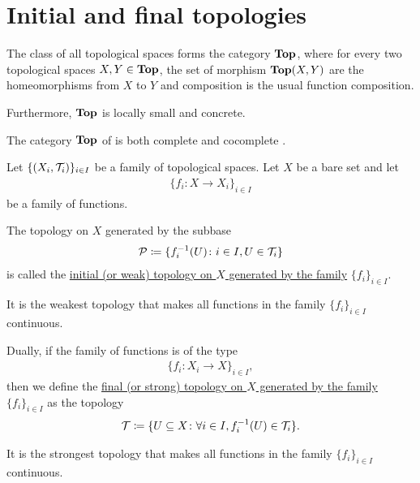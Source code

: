 \section{Initial and final topologies}\label{sec:initial_final_topologies}

\begin{definition}\label{def:category_of_topological_spaces}
  The class of all topological spaces forms the category $\operatorname{\mathbf{Top}}$, where for every two topological spaces $X, Y \in \operatorname{\mathbf{Top}}$, the set of morphism $\operatorname{\mathbf{Top}}(X, Y)$ are the homeomorphisms from $X$ to $Y$ and composition is the usual function composition.

  Furthermore, $\operatorname{\mathbf{Top}}$ is locally small and concrete.
\end{definition}

\begin{theorem}
  The category $\operatorname{\mathbf{Top}}$ of is both complete  and cocomplete .
\end{theorem}

\begin{definition}\label{def:initial_topology}\cite{nLab:top}
  Let $\{ (X_i, \mathcal T_i) \}_{i \in I}$ be a family of topological spaces. Let $X$ be a bare set and let
  \begin{align*}
    \{ f_i: X \to X_i \}_{i \in I}
  \end{align*}
  be a family of functions.

  The topology on $X$ generated by the subbase
  \begin{align*}
    \mathcal P \coloneqq \{ f_i^{-1}(U) \colon i \in I, U \in \mathcal T_i \}
  \end{align*}
  is called the \uline{initial (or weak) topology on $X$ generated by the family} $\{ f_i \}_{i \in I}$.

  It is the weakest topology that makes all functions in the family $\{ f_i \}_{i \in I}$ continuous.
\end{definition}

\begin{definition}\label{def:final_topology}\cite{nLab:top}
  Dually, if the family of functions is of the type
  \begin{align*}
    \{ f_i: X_i \to X \}_{i \in I},
  \end{align*}
  then we define the \uline{final (or strong) topology on $X$ generated by the family} $\{ f_i \}_{i \in I}$ as the topology
  \begin{align*}
    \mathcal T \coloneqq \{ U \subseteq X \colon \forall i \in I, f_i^{-1}(U) \in \mathcal T_i \}.
  \end{align*}

  It is the strongest topology that makes all functions in the family $\{ f_i \}_{i \in I}$ continuous.
\end{definition}

